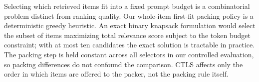 Selecting which retrieved items fit into a fixed prompt budget is a combinatorial problem distinct from ranking quality. Our whole-item first-fit packing policy is a deterministic greedy heuristic. An exact binary knapsack formulation would select the subset of items maximizing total relevance score subject to the token budget constraint; with at most ten candidates the exact solution is tractable in practice. The packing step is held constant across all selectors in our controlled evaluation, so packing differences do not confound the comparison. CTLS affects only the order in which items are offered to the packer, not the packing rule itself.
